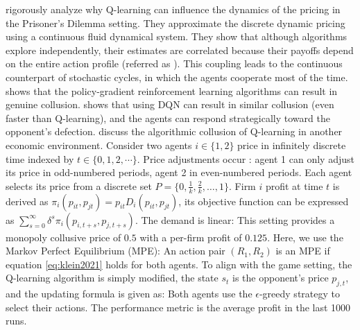 \documentclass[10pt]{report}
\begin{document}
\cite{banchioartificial} rigorously analyze why Q-learning can influence the dynamics of the pricing in the Prisoner’s Dilemma setting. They approximate the discrete dynamic pricing using a continuous fluid dynamical system. They show that although algorithms explore independently, their estimates are correlated because their payoffs depend on the entire action profile (referred as ). This coupling leads to the continuous counterpart of stochastic cycles, in which the agents cooperate most of the time. \\
\cite{martello2022autonomous} shows that the policy-gradient reinforcement learning algorithms can result in genuine collusion. \cite{hettich2021algorithmic} shows that using DQN can result in similar collusion (even faster than Q-learning), and the agents can respond strategically toward the opponent's defection. \cite{klein2021autonomous} discuss the algorithmic collusion of Q-learning in another economic environment. Consider two agents $i\in \{1, 2\}$ price in infinitely discrete time indexed by $t\in\{0, 1, 2, \cdots \}$. Price adjustments occur : agent 1 can only adjust its price in odd-numbered periods, agent 2 in even-numbered periods. Each agent selects its price from a discrete set $P=\{0,\frac{1}{k},\frac{2}{k},\ldots,1\}.$ Firm $i$ profit at time $t$ is derived as $\pi_i(p_{it},p_{jt})=p_{it}D_i(p_{it},p_{jt})$, its objective function can be expressed as $\sum_{s=0}^{\infty}\delta^s \pi_i(p_{i,t+s}, p_{j,t+s})$. The demand is linear:
This setting provides a monopoly collusive price of $0.5$ with a per-firm profit of $0.125$. Here, we use the Markov Perfect Equilibrium (MPE):
An action pair $(R_1, R_2)$ is an MPE if equation \ref{eq:klein2021} holds for both agents. To align with the game setting, the Q-learning algorithm is simply modified,
the state $s_t$ is the opponent's price $p_{j,t}$, and the updating formula is given as:
Both agents use the $\epsilon$-greedy strategy to select their actions. The performance metric is the average profit in the last 1000 runs.
\end{document}
